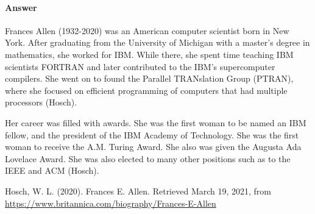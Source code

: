 \documentclass{article}
\begin{document}
\paragraph{Answer}

Frances Allen (1932-2020) was an American computer scientist born in New York. After graduating from the University of Michigan with a master's degree in mathematics, she worked for IBM.
While there, she spent time teaching IBM scientists FORTRAN and later contributed to the IBM's supercomputer compilers. She went on to found the Parallel TRANslation Group (PTRAN), where she focused
on efficient programming of computers that had multiple processors (Hosch). 

Her career was filled with awards. She was the first woman to be named an IBM fellow, and the president of the IBM Academy of Technology. She was the first woman to receive the A.M. Turing Award. She also was given the Augusta Ada Lovelace Award. She was also elected to many other positions such as to the IEEE and ACM (Hosch).

Hosch, W. L. (2020). Frances E. Allen. Retrieved March 19, 2021, from \url{https://www.britannica.com/biography/Frances-E-Allen}

% 
% 
\end{document}
